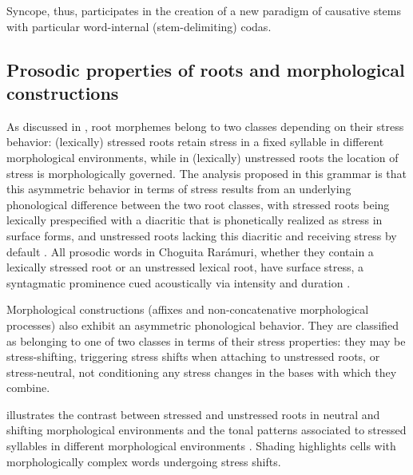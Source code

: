 Syncope, thus, participates in the creation of a new paradigm of causative stems with particular word-internal (stem-delimiting) codas.

\subsection{Prosodic properties of roots and morphological constructions}
\label{subsec: prosodic properties of roots and morphological constructions}

As discussed in , root morphemes belong to two classes depending on their stress behavior: (lexically) stressed roots retain stress in a fixed syllable in different morphological environments, while in (lexically) unstressed roots the location of stress is morphologically governed. The analysis proposed in this grammar is that this asymmetric behavior in terms of stress results from an underlying phonological difference between the two root classes, with stressed roots being lexically prespecified with a diacritic that is phonetically realized as stress in surface forms, and unstressed roots lacking this diacritic and receiving stress by default \parencite{caballero2011multiple}. All prosodic words in Choguita Rarámuri, whether they contain a lexically stressed root or an unstressed lexical root, have surface stress, a syntagmatic prominence cued acoustically via intensity and duration \parencite{caballero2015tone}.

\hspace*{-4.3pt}Morphological constructions (affixes and non-concatenative morphological processes) also exhibit an asymmetric phonological behavior. They are classified as belonging to one of two classes in terms of their stress properties: they may be stress-shifting, triggering stress shifts when attaching to unstressed roots, or stress-neutral, not conditioning any stress changes in the bases with which they combine.

 illustrates the contrast between stressed and unstressed roots in neutral and shifting morphological environments and the tonal patterns associated to stressed syllables in different morphological environments \parencite{caballero2008choguita, caballero2011morphologically}. Shading highlights cells with morphologically complex words undergoing stress shifts.

